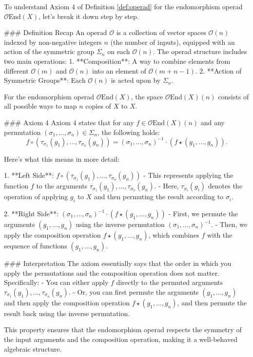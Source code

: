 To understand Axiom 4 of Definition \ref{def:operad} for the endomorphism operad \(\mathcal{O}\text{End}(X)\), let's break it down step by step.

### Definition Recap
An operad \(\mathcal{O}\) is a collection of vector spaces \(\mathcal{O}(n)\) indexed by non-negative integers \(n\) (the number of inputs), equipped with an action of the symmetric group \(\Sigma_n\) on each \(\mathcal{O}(n)\). The operad structure includes two main operations:
1. **Composition**: A way to combine elements from different \(\mathcal{O}(m)\) and \(\mathcal{O}(n)\) into an element of \(\mathcal{O}(m+n-1)\).
2. **Action of Symmetric Groups**: Each \(\mathcal{O}(n)\) is acted upon by \(\Sigma_n\).

For the endomorphism operad \(\mathcal{O}\text{End}(X)\), the space \(\mathcal{O}\text{End}(X)(n)\) consists of all possible ways to map \(n\) copies of \(X\) to \(X\).

### Axiom 4
Axiom 4 states that for any \(f \in \mathcal{O}\text{End}(X)(n)\) and any permutation \((\sigma_1, \ldots, \sigma_n) \in \Sigma_n\), the following holds:
\[ f \circ (\tau_{\sigma_1}(g_1), \ldots, \tau_{\sigma_n}(g_n)) = (\sigma_1, \ldots, \sigma_n)^{-1} \cdot (f \star (g_1, \ldots, g_n)). \]

Here's what this means in more detail:

1. **Left Side**: \( f \circ (\tau_{\sigma_1}(g_1), \ldots, \tau_{\sigma_n}(g_n)) \)
   - This represents applying the function \(f\) to the arguments \(\tau_{\sigma_1}(g_1), \ldots, \tau_{\sigma_n}(g_n)\).
   - Here, \(\tau_{\sigma_i}(g_i)\) denotes the operation of applying \(g_i\) to \(X\) and then permuting the result according to \(\sigma_i\).

2. **Right Side**: \((\sigma_1, \ldots, \sigma_n)^{-1} \cdot (f \star (g_1, \ldots, g_n))\)
   - First, we permute the arguments \((g_1, \ldots, g_n)\) using the inverse permutation \((\sigma_1, \ldots, \sigma_n)^{-1}\).
   - Then, we apply the composition operation \(f \star (g_1, \ldots, g_n)\), which combines \(f\) with the sequence of functions \((g_1, \ldots, g_n)\).

### Interpretation
The axiom essentially says that the order in which you apply the permutations and the composition operation does not matter. Specifically:
- You can either apply \(f\) directly to the permuted arguments \(\tau_{\sigma_1}(g_1), \ldots, \tau_{\sigma_n}(g_n)\).
- Or, you can first permute the arguments \((g_1, \ldots, g_n)\) and then apply the composition operation \(f \star (g_1, \ldots, g_n)\), and then permute the result back using the inverse permutation.

This property ensures that the endomorphism operad respects the symmetry of the input arguments and the composition operation, making it a well-behaved algebraic structure.